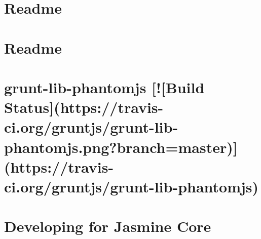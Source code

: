 \documentclass[twoside]{book}
\newcommand{\+}{\discretionary{\mbox{\scriptsize$\hookleftarrow$}}{}{}}
\begin{document}
\chapter{Readme}
\label{md__c_1__users_martin__documents__git_hub_visual_studio__bachelor__wis_r__wis_r_node_modules_gru89688e5cf05bad6b51762365e6ab1a31}
\hypertarget{md__c_1__users_martin__documents__git_hub_visual_studio__bachelor__wis_r__wis_r_node_modules_gru89688e5cf05bad6b51762365e6ab1a31}{}

\chapter{Readme}
\label{md__c_1__users_martin__documents__git_hub_visual_studio__bachelor__wis_r__wis_r_node_modules_gru9094299980b276415a61336538aabb70}
\hypertarget{md__c_1__users_martin__documents__git_hub_visual_studio__bachelor__wis_r__wis_r_node_modules_gru9094299980b276415a61336538aabb70}{}

\chapter{grunt-\/lib-\/phantomjs \mbox{[}!\mbox{[}Build Status\mbox{]}(https\+://travis-\/ci.org/gruntjs/grunt-\/lib-\/phantomjs.png?branch=master)\mbox{]}(https\+://travis-\/ci.org/gruntjs/grunt-\/lib-\/phantomjs)}
\label{md__c_1__users_martin__documents__git_hub_visual_studio__bachelor__wis_r__wis_r_node_modules_grub1d79e637b98f7e834fe58ccce7f6aec}
\hypertarget{md__c_1__users_martin__documents__git_hub_visual_studio__bachelor__wis_r__wis_r_node_modules_grub1d79e637b98f7e834fe58ccce7f6aec}{}

\chapter{Developing for Jasmine Core}
\label{md__c_1__users_martin__documents__git_hub_visual_studio__bachelor__wis_r__wis_r_node_modules_grue87452d1efbd451875cd314b7188da75}
\hypertarget{md__c_1__users_martin__documents__git_hub_visual_studio__bachelor__wis_r__wis_r_node_modules_grue87452d1efbd451875cd314b7188da75}{}

\end{document}
